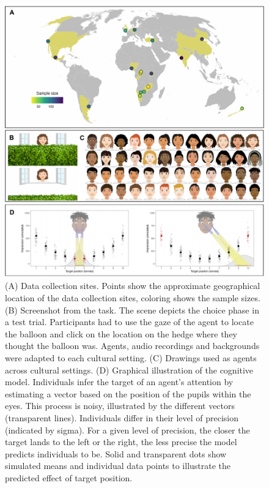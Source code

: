 \documentclass[
  man,floatsintext]{apa6}
\begin{document}
\begin{figure}

{\centering \includegraphics[width=0.75\linewidth]{../visuals/fig1} 

}

\caption{(A) Data collection sites. Points show the approximate geographical location of the data collection sites, coloring shows the sample sizes. (B) Screenshot from the task. The scene depicts the choice phase in a test trial. Participants had to use the gaze of the agent to locate the balloon and click on the location on the hedge where they thought the balloon was. Agents, audio recordings and backgrounds were adapted to each cultural setting. (C) Drawings used as agents across cultural settings. (D) Graphical illustration of the cognitive model. Individuals infer the target of an agent’s attention by estimating a vector based on the position of the pupils within the eyes. This process is noisy, illustrated by the different vectors (transparent lines). Individuals differ in their level of precision (indicated by sigma). For a given level of precision, the closer the  target lands to the left or the right, the less precise the model predicts individuals to be. Solid and transparent dots show simulated means and individual data points to illustrate the predicted effect of target position.}\label{fig:fig1}
\end{figure}
\end{document}
